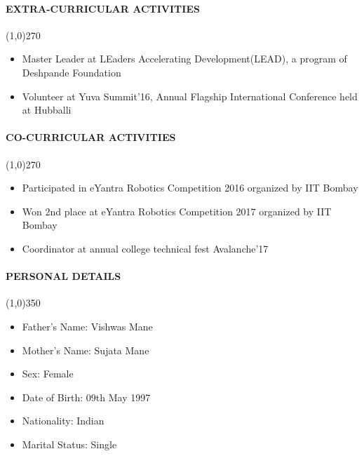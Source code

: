 \documentclass[12pt,a4paper]{article}
\begin{document}
\paragraph{EXTRA-CURRICULAR ACTIVITIES}
	\line(1,0){270}
	\begin{itemize}
		\item Master Leader at LEaders Accelerating Development(LEAD), a program of Deshpande Foundation
		\item Volunteer at Yuva Summit'16, Annual Flagship International Conference held at Hubballi
	\end{itemize}
\paragraph{CO-CURRICULAR ACTIVITIES}
	\line(1,0){270}
	\begin{itemize}
		\item Participated in eYantra Robotics Competition 2016 organized by IIT Bombay
		\item Won 2nd place at eYantra Robotics Competition 2017 organized by IIT Bombay
		\item Coordinator at annual college technical fest Avalanche'17
	\end{itemize}
\paragraph{PERSONAL DETAILS}
	\line(1,0){350}
	\begin{itemize}
		\item Father's Name: Vishwas Mane
		\item Mother's Name: Sujata Mane
		\item Sex: Female
		\item Date of Birth: 09th May 1997
		\item Nationality: Indian
		\item Marital Status: Single
	\end{itemize}
\end{document}

